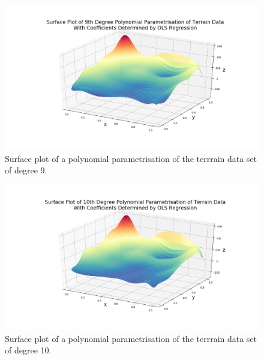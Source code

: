 \documentclass[reprint,english]{revtex4-1}
\begin{document}
\begin{figure}[h]
\centering
\includegraphics[scale=0.25,clip,trim={4cm 2cm 4cm 1cm}]{results/TerrainApprox5/surface_deg9_OLS.png}
\caption{Surface plot of a polynomial parametrisation of the terrrain data set of degree 9.}\label{fig:terrrain_data_contour9}
\end{figure}

\begin{figure}[h]
\centering
\includegraphics[scale=0.25,clip,trim={4cm 2cm 4cm 1cm}]{results/TerrainApprox6/surface_deg10_OLS.png}
\caption{Surface plot of a polynomial parametrisation of the terrrain data set of degree 10.}\label{fig:terrrain_data_contour10}
\end{figure}
\clearpage
~
\onecolumngrid
\end{document}
